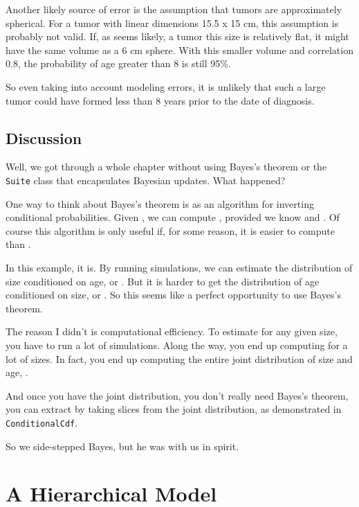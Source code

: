 \documentclass[12pt]{book}
\theoremstyle{exercise}
\newcommand{\py}[1]{{\tt #1}}%
\begin{document}
Another likely source of error is the assumption that tumors are
approximately spherical.  For a tumor with linear dimensions 15.5 x 15
cm, this assumption is probably not valid.  If, as seems likely, a
tumor this size
is relatively flat, it might have the same volume as a 6 cm sphere.
With this smaller volume and correlation 0.8, the probability of age
greater than 8 is still 95\%.

So even taking into account modeling errors, it is unlikely that such
a large tumor could have formed less than 8 years prior to the date of
diagnosis.


\section{Discussion}

Well, we got through a whole chapter without using Bayes's theorem or
the \py{Suite} class that encapsulates Bayesian updates.  What
happened?

One way to think about Bayes's theorem is as an algorithm for
inverting conditional probabilities.  Given , we can compute
, provided we know  and .  Of course this algorithm
is only useful if, for some reason, it is easier to compute 
than .

In this example, it is.  By running simulations, we can estimate the
distribution of size conditioned on age, or .  But it is
harder to get the distribution of age conditioned on size, or
.  So this seems like a perfect opportunity to use Bayes's
theorem.

The reason I didn't is computational efficiency.  To estimate
 for any given size, you have to run a lot of simulations.
Along the way, you end up computing  for a lot of sizes.
In fact, you end up computing the entire joint distribution of size
and age, .

And once you have the joint distribution, you don't really need
Bayes's theorem, you can extract  by taking slices from
the joint distribution, as demonstrated in \py{ConditionalCdf}.

So we side-stepped Bayes, but he was with us in spirit.


\chapter{A Hierarchical Model}
\label{hierarchical}
\end{document}

